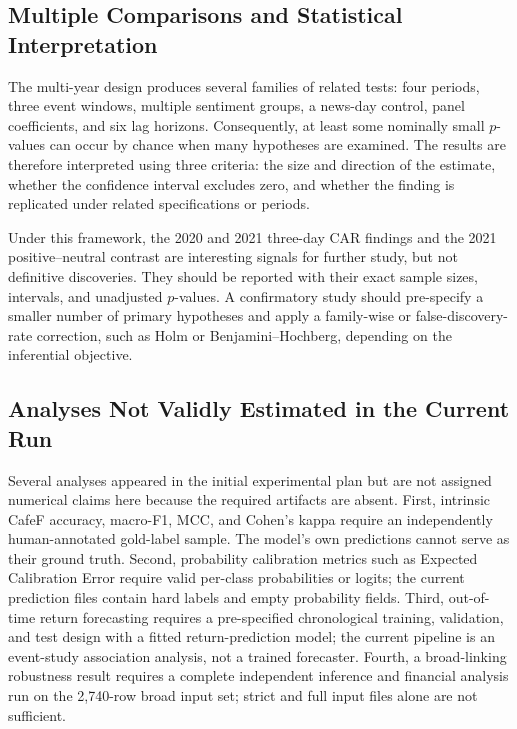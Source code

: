 \subsection{Multiple Comparisons and Statistical Interpretation}
\label{subsec:multiple-comparisons}

The multi-year design produces several families of related tests: four periods, three event windows, multiple sentiment groups, a news-day control, panel coefficients, and six lag horizons. Consequently, at least some nominally small $p$-values can occur by chance when many hypotheses are examined. The results are therefore interpreted using three criteria: the size and direction of the estimate, whether the confidence interval excludes zero, and whether the finding is replicated under related specifications or periods.

Under this framework, the 2020 and 2021 three-day CAR findings and the 2021 positive--neutral contrast are interesting signals for further study, but not definitive discoveries. They should be reported with their exact sample sizes, intervals, and unadjusted $p$-values. A confirmatory study should pre-specify a smaller number of primary hypotheses and apply a family-wise or false-discovery-rate correction, such as Holm or Benjamini--Hochberg, depending on the inferential objective.

\subsection{Analyses Not Validly Estimated in the Current Run}
\label{subsec:deferred-analyses-multi-year}

Several analyses appeared in the initial experimental plan but are not assigned numerical claims here because the required artifacts are absent. First, intrinsic CafeF accuracy, macro-F1, MCC, and Cohen's kappa require an independently human-annotated gold-label sample. The model's own predictions cannot serve as their ground truth. Second, probability calibration metrics such as Expected Calibration Error require valid per-class probabilities or logits; the current prediction files contain hard labels and empty probability fields. Third, out-of-time return forecasting requires a pre-specified chronological training, validation, and test design with a fitted return-prediction model; the current pipeline is an event-study association analysis, not a trained forecaster. Fourth, a broad-linking robustness result requires a complete independent inference and financial analysis run on the 2,740-row broad input set; strict and full input files alone are not sufficient.

